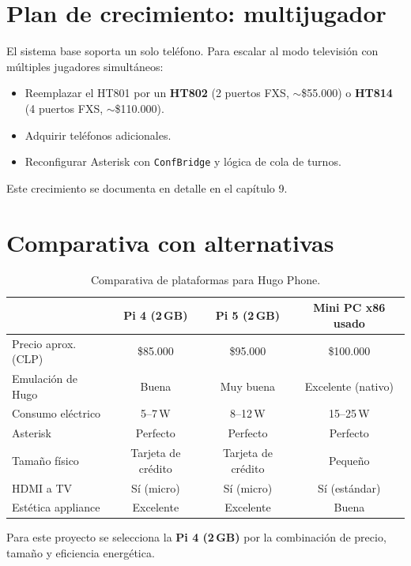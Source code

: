 \section{Plan de crecimiento: multijugador}

El sistema base soporta un solo teléfono. Para escalar al modo televisión con múltiples jugadores simultáneos:

\begin{itemize}
  \item Reemplazar el HT801 por un \textbf{HT802} (2 puertos FXS, $\sim$\$55.000) o \textbf{HT814} (4 puertos FXS, $\sim$\$110.000).
  \item Adquirir teléfonos adicionales.
  \item Reconfigurar Asterisk con \texttt{ConfBridge} y lógica de cola de turnos.
\end{itemize}

Este crecimiento se documenta en detalle en el capítulo 9.

\section{Comparativa con alternativas}

\begin{table}[h]
\centering
\begin{tabular}{lccc}
\toprule
& \textbf{Pi 4 (2\,GB)} & \textbf{Pi 5 (2\,GB)} & \textbf{Mini PC x86 usado} \\
\midrule
Precio aprox. (CLP) & \$85.000 & \$95.000 & \$100.000 \\
Emulación de Hugo & Buena & Muy buena & Excelente (nativo) \\
Consumo eléctrico & 5--7\,W & 8--12\,W & 15--25\,W \\
Asterisk & Perfecto & Perfecto & Perfecto \\
Tamaño físico & Tarjeta de crédito & Tarjeta de crédito & Pequeño \\
HDMI a TV & Sí (micro) & Sí (micro) & Sí (estándar) \\
Estética appliance & Excelente & Excelente & Buena \\
\bottomrule
\end{tabular}
\caption{Comparativa de plataformas para Hugo Phone.}
\end{table}

Para este proyecto se selecciona la \textbf{Pi 4 (2\,GB)} por la combinación de precio, tamaño y eficiencia energética.
